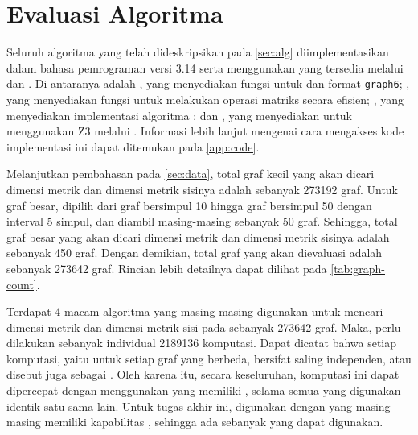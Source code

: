 \section{Evaluasi Algoritma}
\label{sec:implementation}

Seluruh algoritma yang telah dideskripsikan pada \autoref{sec:alg} diimplementasikan dalam bahasa pemrograman  versi 3.14 serta menggunakan  yang tersedia melalui  dan . Di antaranya adalah , yang menyediakan fungsi untuk  dan  format \verb`graph6`; , yang menyediakan fungsi untuk melakukan operasi matriks secara efisien; , yang menyediakan implementasi algoritma ; dan , yang menyediakan  untuk menggunakan  Z3 melalui . Informasi lebih lanjut mengenai cara mengakses kode implementasi ini dapat ditemukan pada \cref{app:code}.

Melanjutkan pembahasan pada \autoref{sec:data}, total graf kecil yang akan dicari dimensi metrik dan dimensi metrik sisinya adalah sebanyak 273192 graf. Untuk graf besar, dipilih dari graf bersimpul 10 hingga graf bersimpul 50 dengan interval 5 simpul, dan diambil masing-masing sebanyak 50 graf. Sehingga, total graf besar yang akan dicari dimensi metrik dan dimensi metrik sisinya adalah sebanyak 450 graf. Dengan demikian, total graf yang akan dievaluasi adalah sebanyak 273642 graf. Rincian lebih detailnya dapat dilihat pada \autoref{tab:graph-count}.

\begin{center}
	\renewcommand{\minipagewidth}{0.35\linewidth}
	
\end{center}

Terdapat 4 macam algoritma yang masing-masing digunakan untuk mencari dimensi metrik dan dimensi metrik sisi pada sebanyak 273642 graf. Maka, perlu dilakukan sebanyak individual 2189136 komputasi. Dapat dicatat bahwa setiap komputasi, yaitu untuk setiap graf yang berbeda, bersifat saling independen, atau disebut juga sebagai . Oleh karena itu, secara keseluruhan, komputasi ini dapat dipercepat dengan menggunakan  yang memiliki , selama semua  yang digunakan identik satu sama lain. Untuk tugas akhir ini, digunakan  dengan  yang masing-masing memiliki kapabilitas , sehingga ada sebanyak  yang dapat digunakan.

